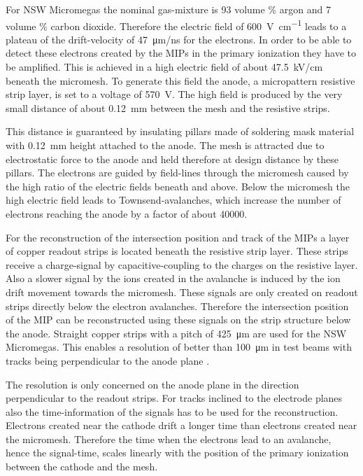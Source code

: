 \documentclass[
twoside,            %
BCOR1.4cm,          %
10pt,               %
headings=normal,    %
headsepline,        %
clearplainpage,		%
final,              %
div=14,
open=right,
bibliography=toc
]{scrreprt}
\begin{document}
For NSW Micromegas the nominal gas-mixture is 93 volume \% argon and 7 volume \% carbon dioxide. 
Therefore the electric field of \SI{600}{\V\per\cm} leads to a plateau of the drift-velocity of \SI{47}{\micro m/ns} for the electrons.
In order to be able to detect these electrons created by the MIPs in the primary ionization they have to be amplified.
This is achieved in a high electric field of about \SI{47.5}{kV/cm} beneath the micromesh.
To generate this field the anode, a micropattern resistive strip layer, is set to a voltage of \SI{570}{V}.
The high field is produced by the very small distance of about \SI{0.12}{mm} between the mesh and the resistive strips.

This distance is guaranteed by insulating pillars made of soldering mask material with \SI{0.12}{mm} height attached to the anode.
The mesh is attracted due to electrostatic force to the anode and held therefore at design distance by these pillars.
The electrons are guided by field-lines through the micromesh caused by the high ratio of the electric fields beneath and above.
Below the micromesh the high electric field leads to Townsend-avalanches, which increase the number of electrons reaching the anode by a factor of about 40000.

For the reconstruction of the intersection position and track of the MIPs a layer of copper readout strips is located beneath the resistive strip layer.
These strips receive a charge-signal by capacitive-coupling to the charges on the resistive layer.
Also a slower signal by the ions created in the avalanche is induced by the ion drift movement towards the micromesh.
These signals are only created on readout strips directly below the electron avalanches.
Therefore the intersection position of the MIP can be reconstructed using these signals on the strip structure below the anode. 
Straight copper strips with a pitch of \SI{425}{\micro m} are used for the NSW Micromegas.
This enables a resolution of better than \SI{100}{\micro m} in test beams with tracks being perpendicular to the anode plane \cite{flierlThesis}. 

The resolution is only concerned on the anode plane in the direction perpendicular to the readout strips.
For tracks inclined to the electrode planes also the time-information of the signals has to be used for the reconstruction.
Electrons created near the cathode drift a longer time than electrons created near the micromesh.
Therefore the time when the electrons lead to an avalanche, hence the signal-time, scales linearly with the position of the primary ionization between the cathode and the mesh.
\end{document}
